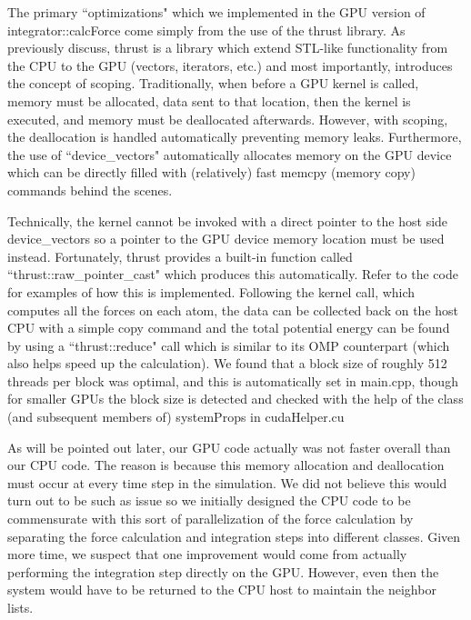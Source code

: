 \documentclass[12pt]{article}
\begin{document}
\begin{description}
The primary ``optimizations" which we implemented in the GPU version of integrator::calcForce come simply from the use of the thrust library.  As previously discuss, thrust is a library which extend STL-like functionality from the CPU to the GPU (vectors, iterators, etc.) and most importantly, introduces the concept of scoping.  Traditionally, when before a GPU kernel is called, memory must be allocated, data sent to that location, then the kernel is executed, and memory must be deallocated afterwards.  However, with scoping, the deallocation is handled automatically preventing memory leaks.  Furthermore, the use of ``device\_vectors" automatically allocates memory on the GPU device which can be directly filled with (relatively) fast memcpy (memory copy) commands behind the scenes.

Technically, the kernel cannot be invoked with a direct pointer to the host side device\_vectors so a pointer to the GPU device memory location must be used instead.  Fortunately, thrust provides a built-in function called ``thrust::raw\_pointer\_cast" which produces this automatically.  Refer to the code for examples of how this is implemented.  Following the kernel call, which computes all the forces
on each atom, the data can be collected back on the host CPU with a simple copy command and the total potential energy can be found by using a ``thrust::reduce" call which is similar to its OMP counterpart (which also helps speed up the calculation).  We found that a block size of roughly 512 threads per block was optimal, and this is automatically set in main.cpp, though for smaller GPUs the block size is detected and checked with the help of the class (and subsequent members of) systemProps in cudaHelper.cu

As will be pointed out later, our GPU code actually was not faster overall than our CPU code.  The reason is because this memory allocation and deallocation must occur at every time step in the simulation.  We did not believe this would turn out to be such as issue so we initially designed the CPU code to be commensurate with this sort of parallelization of the force calculation by separating the force calculation and integration steps into different classes.  Given more time, we suspect that one improvement would come from actually performing the integration step directly on the GPU.  However, even then the system would have to be returned to the CPU host to maintain the neighbor lists.  


\end{description}
\end{document}
